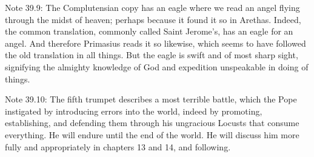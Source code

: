 Note 39.9: The Complutensian copy has an eagle where we read an angel flying through the midst of heaven; perhaps because it found it so in Arethas. Indeed, the common translation, commonly called Saint Jerome’s, has an eagle for an angel. And therefore Primasius reads it so likewise, which seems to have followed the old translation in all things. But the eagle is swift and of most sharp sight, signifying the almighty knowledge of God and expedition unspeakable in doing of things.

Note 39.10: The fifth trumpet describes a most terrible battle, which the Pope instigated by introducing errors into the world, indeed by promoting, establishing, and defending them through his ungracious Locusts that consume everything. He will endure until the end of the world. He will discuss him more fully and appropriately in chapters 13 and 14, and following.

